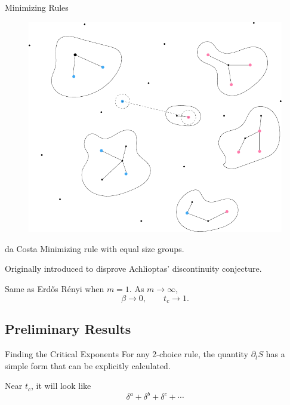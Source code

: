 \documentclass{beamer}
\newcommand{\ER}{Erd\H{o}s R\'enyi\xspace}
\begin{document}
\begin{frame}{Minimizing Rules}
        \begin{figure}[H]
                \centering
                \includegraphics[scale=0.7]{fig/minimizing-3.pdf}
        \end{figure}
\end{frame}

\begin{frame}{da Costa}
	Minimizing rule with equal size groups.
	\vspace{5mm}

	Originally introduced to disprove Achlioptas' discontinuity conjecture.
	\vspace{5mm}

	Same as \ER when $m=1$. As $m\to \infty$,
	\[
	\beta\to 0, \quad\quad t_c \to 1.
	\]
\end{frame}

\subsection{Preliminary Results}

\begin{frame}{Finding the Critical Exponents}
	For any 2-choice rule, the quantity $\partial_{t}{S} $ has a simple form that can be explicitly calculated.
	\vspace{5mm}

	Near $t_c$, it will look like
	\[
	\delta^{a}+\delta^{b}+\delta^{c}+\cdots
	\] 
\end{frame}
\end{document}
